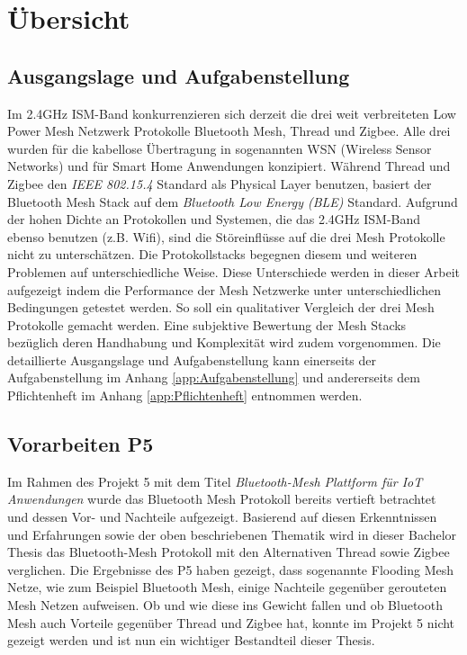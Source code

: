 \clearpage

\section{Übersicht}\label{sec:Uebersicht}

\subsection{Ausgangslage und Aufgabenstellung}\label{subsec:AusgangslageundAufgabenstellung}

Im 2.4GHz ISM-Band kon­kur­ren­zie­ren sich derzeit die drei weit verbreiteten Low Power Mesh Netzwerk Protokolle Bluetooth Mesh, Thread und Zigbee.
Alle drei wurden für die kabellose Übertragung in sogenannten WSN (Wireless Sensor Networks) und für Smart Home Anwendungen konzipiert.
Während Thread und Zigbee den \textit{IEEE 802.15.4} Standard als Physical Layer benutzen, basiert der Bluetooth Mesh Stack auf dem \textit{Bluetooth Low Energy (BLE)} Standard.
Aufgrund der hohen Dichte an Protokollen und Systemen, die das 2.4GHz ISM-Band ebenso benutzen (z.B. Wifi), sind die Störeinflüsse auf die drei Mesh Protokolle nicht zu unterschätzen.
Die Protokollstacks begegnen diesem und weiteren Problemen auf unterschiedliche Weise.
Diese Unterschiede werden in dieser Arbeit aufgezeigt indem die Performance der Mesh Netzwerke unter unterschiedlichen Bedingungen getestet werden.
So soll ein qualitativer Vergleich der drei Mesh Protokolle gemacht werden.
Eine subjektive Bewertung der Mesh Stacks bezüglich deren Handhabung und Komplexität wird zudem vorgenommen.
Die detaillierte Ausgangslage und Aufgabenstellung kann einerseits der Aufgabenstellung im Anhang \ref{app:Aufgabenstellung} und andererseits dem Pflichtenheft im Anhang \ref{app:Pflichtenheft} entnommen werden.

\subsection{Vorarbeiten P5}\label{subsec:VorarbeitenP5}
Im Rahmen des Projekt 5 mit dem Titel \textit{Bluetooth-Mesh Plattform für IoT Anwendungen} wurde das Bluetooth Mesh Protokoll bereits vertieft betrachtet und dessen Vor- und Nachteile aufgezeigt. 
Basierend auf diesen Erkenntnissen und Erfahrungen sowie der oben beschriebenen Thematik wird in dieser Bachelor Thesis das Bluetooth-Mesh Protokoll mit den Alternativen Thread sowie Zigbee verglichen.
Die Ergebnisse des P5 haben gezeigt, dass sogenannte Flooding Mesh Netze, wie zum Beispiel Bluetooth Mesh, einige Nachteile gegenüber gerouteten Mesh Netzen aufweisen. Ob und wie diese ins Gewicht fallen und ob Bluetooth Mesh auch Vorteile gegenüber Thread und Zigbee hat, konnte im Projekt 5 nicht gezeigt werden und ist nun ein wichtiger Bestandteil dieser Thesis.

